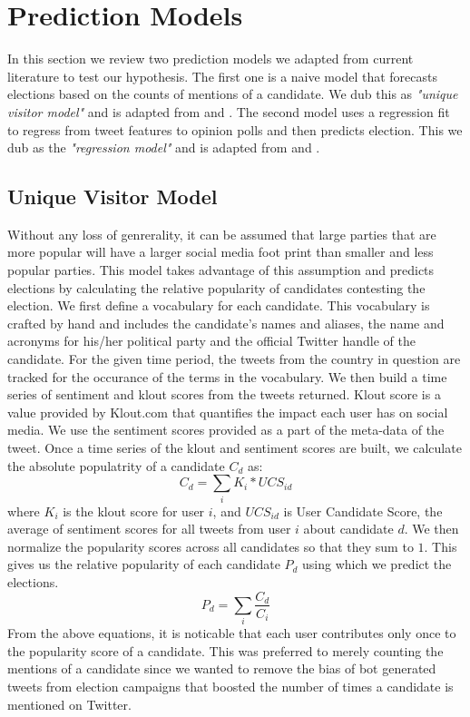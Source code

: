 \chapter{Prediction Models}

In this section we review two prediction models we adapted from current literature to test our hypothesis. 
The first one is a naive model that forecasts elections based on the counts of mentions of a candidate.
We dub this as  \emph{"unique visitor model"} and is adapted from \cite{saez2011total} and \cite{tumasjan2010predicting}.
The second model uses a regression fit to regress from tweet features to opinion polls and then predicts election. 
This we dub as the \emph{"regression model"} and is adapted from \cite{bermingham2011using} and \cite{o2010tweets}.
\section{Unique Visitor Model}
Without any loss of genrerality, it can be assumed that large parties that are more popular will have a larger social media foot print than smaller and less popular parties. 
This model takes advantage of this assumption and predicts elections by calculating the relative popularity of candidates contesting the election.
We first define a vocabulary for each candidate. 
This vocabulary is crafted by hand and includes the candidate's names and aliases, the name and acronyms for his/her political party and the official Twitter handle of the candidate.
For the given time period, the tweets from the country in question are tracked for the occurance of the terms in the vocabulary.
We then build a time series of sentiment and klout scores from the tweets returned.
Klout score is a value provided by Klout.com that quantifies the impact each user has on social media. 
We use the sentiment scores provided as a part of the meta-data of the tweet. 
Once a time series of the klout and sentiment scores are built, we calculate the absolute populatrity of a candidate $C_d$ as:
\begin{equation}
{C_d} = \sum_i K_i * UCS_{id}
\end{equation}
where $K_i$ is the klout score for user $i$, and $UCS_{id}$ is User Candidate Score, the average of sentiment scores for all tweets from user $i$ about candidate $d$.
We then normalize the popularity scores across all candidates so that they sum to $1$.
This gives us the relative popularity of each candidate $P_d$ using which we predict the elections.
\begin{equation}
{P_d} = \sum_i \frac{C_d}{C_i}
\end{equation}
From the above equations, it is noticable that each user contributes only once to the popularity score of a candidate.
This was preferred to merely counting the mentions of a candidate since we wanted to remove the bias of bot generated tweets from election campaigns that boosted the number of times a candidate is mentioned on Twitter.

